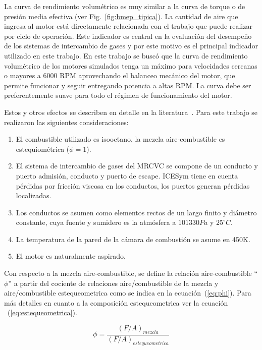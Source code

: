 La curva de rendimiento volumétrico es muy similar a la curva de torque o de
presión media efectiva (ver Fig.~\ref{fig:bmep_tipica}).
%
La cantidad de aire que ingresa al motor está directamente relacionada con el
trabajo que puede realizar por ciclo de operación.
%
Este indicador es central en la evaluación del desempeño de los sistemas de
intercambio de gases y por este motivo es el principal indicador utilizado en
este trabajo.
%
En este trabajo se buscó que la curva de rendimiento volumétrico de los motores
simulados tenga un máximo para velocidades cercanas o mayores a 6000 RPM
aprovechando el balanceo mecánico del motor, que permite funcionar y seguir
entregando potencia a altas RPM.
%
La curva debe ser preferentemente suave para todo el régimen de funcionamiento
del motor.

Estos y otros efectos se describen en detalle en la
literatura~\parencite{heywood}.
%
Para este trabajo se realizaron las siguientes consideraciones:

\begin{enumerate}
    \item El combustible utilizado es isooctano, la mezcla aire-combustible es
estequiométrica ($\phi=1$).
    \item El sistema de intercambio de gases del MRCVC se compone de un conducto
y puerto admisión, conducto y puerto de escape.
        ICESym tiene en cuenta pérdidas por fricción viscosa en los conductos,
los puertos generan pérdidas localizadas.
    \item Los conductos se asumen como elementos rectos de un largo finito y
diámetro constante, cuya fuente y sumidero es la atmósfera a $101330 Pa$ y
$25^{\circ}C$.
    \item La temperatura de la pared de la cámara de combustión se asume en
450K.
    \item El motor es naturalmente aspirado.
\end{enumerate}
%

Con respecto a la mezcla aire-combustible, se define la relación
aire-combustible ``$\phi$'' a partir del cociente de relaciones aire/combustible
de la mezcla y aire/combustible estequeometrica como se indica en la
ecuación~(\ref{eq:phi}).
%
Para más detalles en cuanto a la composición estequeometrica ver la ecuación
~(\ref{eq:estequeometrica}).

\begin{equation}
  \label{eq:phi}
  \phi = \frac{(F/A)_{mezcla}}{(F/A)_{estequeometrica}}
\end{equation}

